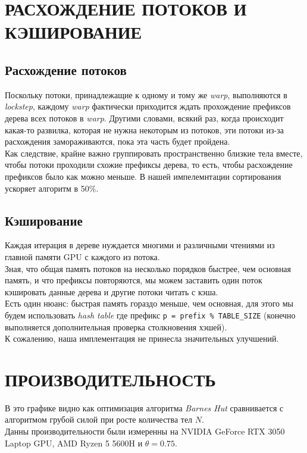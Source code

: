 \documentclass{article}
\begin{document}
\pagebreak
\section{РАСХОЖДЕНИЕ ПОТОКОВ И КЭШИРОВАНИЕ}
\subsection{Расхождение потоков}

Поскольку потоки, принадлежащие к одному и тому же \textit{warp}, выполняются в \textit{lockstep}, каждому \textit{warp} фактически приходится ждать прохождение префиксов дерева всех потоков в \textit{warp}. Другими словами, всякий раз, когда происходит какая-то развилка, которая не нужна некоторым из потоков, эти потоки из-за расхождения замораживаются, пока эта часть будет пройдена.\\
Как следствие, крайне важно группировать пространственно близкие тела вместе, чтобы потоки проходили схожие префиксы дерева, то есть, чтобы расхождение префиксов было как можно меньше.
В нашей импелемнтации сортирования ускоряет алгоритм в 50\%.

\subsection{Кэширование}
Каждая итерация в дереве нуждается многими и различными чтениями из главной памяти GPU с каждого из потока.\\
Зная, что общая память потоков на несколько порядков быстрее, чем основная память, и что префиксы повторяются, мы можем заставить один поток кэшировать данные дерева и другие потоки читать с кэша.\\
Есть один нюанс: быстрая память гораздо меньше, чем основная, для этого мы будем использовать \textit{hash table} где префикс \texttt{p = prefix \% TABLE\_SIZE} (конечно выполняется дополнительная проверка столкновения хэшей).\\
К сожалению, наша имплементация не принесла значительных улучшений.

\pagebreak
\section{ПРОИЗВОДИТЕЛЬНОСТЬ}
В это графике видно как оптимизация алгоритма \textit{Barnes Hut} сравнивается с алгоритмом грубой силой при росте количества тел $N$.\\
Данны производительности были измеренны на NVIDIA GeForce RTX 3050 Laptop GPU, AMD Ryzen 5 5600H и $\theta = 0.75$.
\end{document}
